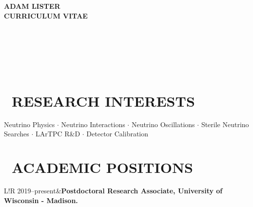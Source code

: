 \documentclass[12pt]{article}
\newcommand\VRule{\color{themecol}\vrule width 2pt}
\newcommand{\titl}{\color{themecol}\raisebox{1pt}{$\lgblksquare$}\color{black}\ }
\begin{document}
\begin{minipage}{0.95\textwidth}
\begin{flushright}
\Huge{\textbf{ADAM LISTER}}\\
\Huge{\textbf{CURRICULUM VITAE}}\\
\end{flushright}
\end{minipage}\\

\vspace{3em}

\begin{minipage}{1.0\textwidth}
\begin{minipage}[ht]{0.04\textwidth}
\centering
\color{themecol}
\raisebox{3pt}{\faMapMarker}\\
\raisebox{3pt}{\faEnvelope}\\
\raisebox{3pt}{\faMousePointer}\\
\raisebox{3pt}{\faPhone}
\end{minipage}
\end{minipage}


\section*{\titl RESEARCH INTERESTS}
  Neutrino Physics $\cdot$ Neutrino Interactions $\cdot$ Neutrino Oscillations $\cdot$ Sterile Neutrino Searches $\cdot$ LArTPC R\&D $\cdot$ Detector Calibration

\section*{\titl ACADEMIC POSITIONS}
\noindent\begin{longtable}{L!{\VRule}R}
2019--present&{\bf Postdoctoral Research Associate, University of Wisconsin - Madison.}
\end{longtable}
\end{document}
